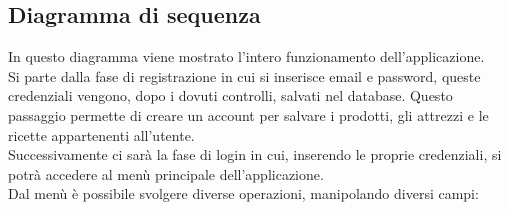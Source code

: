 \documentclass[a4paper, titlepage]{article}
\begin{document}
\subsection{Diagramma di sequenza}
In questo diagramma viene mostrato l'intero funzionamento dell'applicazione.\\
Si parte dalla fase di registrazione in cui si inserisce email e password, queste credenziali vengono, dopo i dovuti controlli, salvati nel database. Questo passaggio permette di creare un account per salvare i prodotti, gli attrezzi e le ricette appartenenti all'utente.\\
Successivamente ci sarà la fase di login in cui, inserendo le proprie credenziali, si potrà accedere al menù principale dell'applicazione.\\
Dal menù è possibile svolgere diverse operazioni, manipolando diversi campi:
\end{document}
